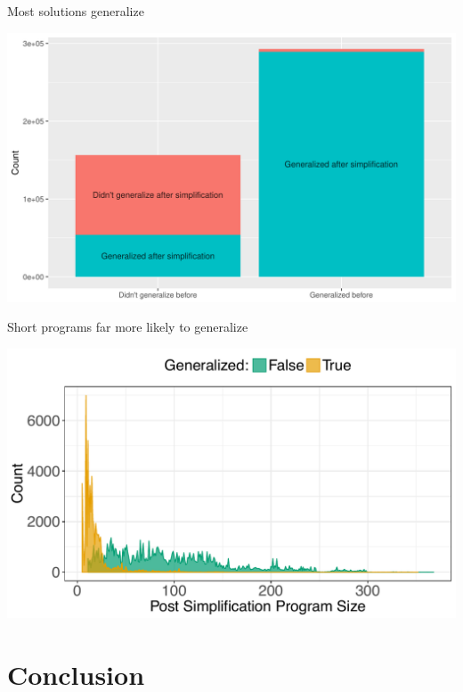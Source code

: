 \documentclass{beamer}
\begin{document}
\begin{frame}{Most solutions generalize}

\begin{center}
	\includegraphics[width=\linewidth]{Illustrations/Generalization_counts}
\end{center}

\end{frame}

\begin{frame}{Short programs far more likely to generalize}
\begin{center}
	\includegraphics[width=0.9\linewidth]{Illustrations/Size_Density_final}
\end{center}

\end{frame}

\section{Conclusion}
\end{document}
